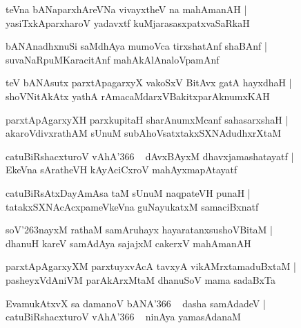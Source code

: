 \documentclass[twoside,12pt,openright]{book}
\def\S{\char'263}
\newcounter{shloka}[chapter]
\begin{document}
\begin{shloka}%
teVna bANaparxhAreVNa vivayxtheV na mahAmanAH |\\
yasiTxkAparxharoV yadavxtf kuMjarasasxpatxvaSaRkaH 
\end{shloka}

\begin{shloka}%
bANAnadhxnuSi saMdhAya mumoVca tirxshatAnf shaBAnf |\\
suvaNaRpuMKaracitAnf mahAkAlAnaloVpamAnf
\end{shloka}

\begin{shloka}%
teV bANAsutx parxtApagarxyX vakoSxV BitAvx gatA hayxdhaH |\\
shoVNitAkAtx yathA rAmacaMdarxVBakitxparAknumxKAH 
\end{shloka}

\begin{shloka}%
parxtApAgarxyXH parxkupitaH sharAnumxMcanf sahasarxshaH |\\
akaroVdivxrathAM sUnuM subAhoVsatxtakxSXNAdudhxrXtaM 
\end{shloka}

\begin{shloka}%
catuBiRshacxturoV vAhA\char'366 ~ dAvxBAyxM dhavxjamashatayatf |\\
EkeVna sAratheVH kAyAciCxroV mahAyxmapAtayatf 
\end{shloka}

\begin{shloka}%
catuBiRsAtxDayAmAsa taM sUnuM naqpateVH punaH |\\
tatakxSXNAcAcxpameVkeVna guNayukatxM samaciBxnatf 
\end{shloka}

\begin{shloka}%
soV\S nayxM rathaM samAruhayx hayaratanxsushoVBitaM |\\
dhanuH kareV samAdAya sajajxM cakerxV mahAmanAH 
\end{shloka}

\begin{shloka}%
parxtApAgarxyXM parxtuyxvAcA tavxyA vikAMrxtamaduBxtaM |\\
pasheyxVdAniVM parAkArxMtaM dhanuSoV mama sadaBxTa
\end{shloka}

\begin{shloka}%
EvamukAtxvX sa damanoV bANA\char'366 ~ dasha samAdadeV |\\
catuBiRshacxturoV vAhA\char'366 ~ ninAya yamasAdanaM 
\end{shloka}
\end{document}

